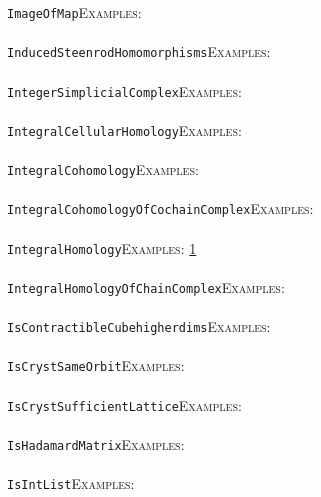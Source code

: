 \documentclass[a4paper,11pt]{report}
\begin{document}
{{ \texttt{ImageOfMap}{\nobreakspace}{\nobreakspace}{\nobreakspace}{\nobreakspace}\textsc{Examples:} \\
 \\
 \texttt{InducedSteenrodHomomorphisms}{\nobreakspace}{\nobreakspace}{\nobreakspace}{\nobreakspace}\textsc{Examples:} \\
 \\
 \texttt{IntegerSimplicialComplex}{\nobreakspace}{\nobreakspace}{\nobreakspace}{\nobreakspace}\textsc{Examples:} \\
 \\
 \texttt{IntegralCellularHomology}{\nobreakspace}{\nobreakspace}{\nobreakspace}{\nobreakspace}\textsc{Examples:} \\
 \\
 \texttt{IntegralCohomology}{\nobreakspace}{\nobreakspace}{\nobreakspace}{\nobreakspace}\textsc{Examples:} \\
 \\
 \texttt{IntegralCohomologyOfCochainComplex}{\nobreakspace}{\nobreakspace}{\nobreakspace}{\nobreakspace}\textsc{Examples:} \\
 \\
 \texttt{IntegralHomology}{\nobreakspace}{\nobreakspace}{\nobreakspace}{\nobreakspace}\textsc{Examples:} \href{../www/SideLinks/About/aboutPerformance.html} {1}{\nobreakspace} \\
 \\
 \texttt{IntegralHomologyOfChainComplex}{\nobreakspace}{\nobreakspace}{\nobreakspace}{\nobreakspace}\textsc{Examples:} \\
 \\
 \texttt{IsContractibleCube{\textunderscore}higherdims}{\nobreakspace}{\nobreakspace}{\nobreakspace}{\nobreakspace}\textsc{Examples:} \\
 \\
 \texttt{IsCrystSameOrbit}{\nobreakspace}{\nobreakspace}{\nobreakspace}{\nobreakspace}\textsc{Examples:} \\
 \\
 \texttt{IsCrystSufficientLattice}{\nobreakspace}{\nobreakspace}{\nobreakspace}{\nobreakspace}\textsc{Examples:} \\
 \\
 \texttt{IsHadamardMatrix}{\nobreakspace}{\nobreakspace}{\nobreakspace}{\nobreakspace}\textsc{Examples:} \\
 \\
 \texttt{IsIntList}{\nobreakspace}{\nobreakspace}{\nobreakspace}{\nobreakspace}\textsc{Examples:} \\
}}
\end{document}

